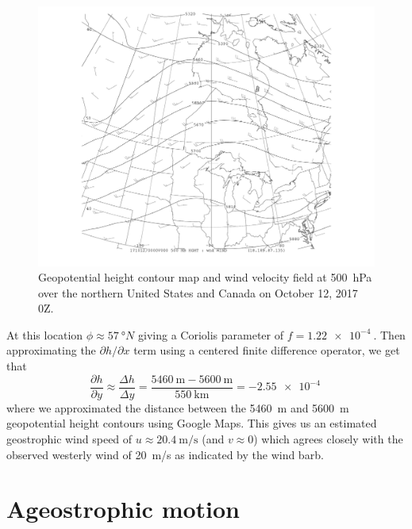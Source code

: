 \documentclass[11pt]{article}
\newcommand\p[2]{\frac{\partial #1}{\partial #2}}
\begin{document}
\begin{figure}[h!]
	\centering
	\includegraphics[trim={3.5cm 1cm 3.5cm 0},clip,width=\textwidth]{500hPa_hght_wind_hudson_bay}
	\caption{Geopotential height contour map and wind velocity field at \SI{500}{\hecto\Pa} over the northern United States and Canada on October 12, 2017 0Z.}
	\label{fig:hudson}
\end{figure}

At this location $\phi \approx \SI{57}{\degree N}$ giving a Coriolis parameter of $f = \SI{1.22e-4}{}$. Then approximating the $\partial h/\partial x$ term using a centered finite difference operator, we get that
\begin{equation*}
	\p{h}{y} \approx \frac{\Delta h}{\Delta y} = \frac{\SI{5460}{\m} - \SI{5600}{\m}}{\SI{550}{\km}} = \SI{-2.55e-4}{}
\end{equation*}
where we approximated the distance between the \SI{5460}{\m} and \SI{5600}{\m} geopotential height contours using Google Maps. This gives us an estimated geostrophic wind speed of $u \approx \SI{20.4}{\m/\s}$ (and $v \approx 0$) which agrees closely with the observed westerly wind of \SI{20}{\m/\s} as indicated by the wind barb.

\section{Ageostrophic motion}
\end{document}
